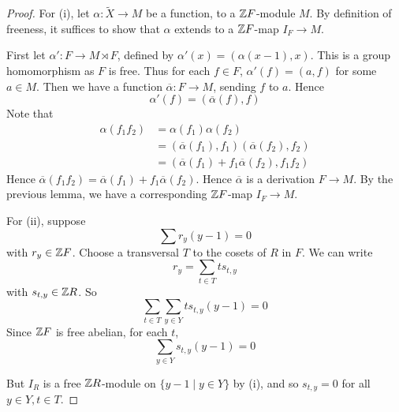 \documentclass{article}
\begin{document}
\begin{proof}
    For (i), let \(\alpha : \widetilde X \to M\) be a function, to a \(\mathbb{Z} F\)-module \(M\). By definition of freeness, it suffices to show that \(\alpha\) extends to a \(\mathbb{Z} F\)-map \(I_F \to M\).

    First let \(\alpha' : F \to M \rtimes F\), defined by \(\alpha'(x) = (\alpha(x - 1), x)\). This is a group homomorphism as \(F\) is free. Thus for each \(f \in F\), \(\alpha'(f) = (a, f)\) for some \(a \in M\). Then we have a function \(\overline{\alpha} : F \to M\), sending \(f\) to \(a\). Hence
    \[\alpha'(f) = (\overline{\alpha}(f), f)\]
    Note that 
    \begin{align*}
        \alpha(f_1f_2) &= \alpha(f_1)\alpha(f_2) \\
        &= (\overline{\alpha}(f_1), f_1)(\overline{\alpha}(f_2), f_2) \\
        &= (\overline{\alpha}(f_1) + f_1\overline{\alpha}(f_2), f_1f_2)
    \end{align*}
    Hence \(\overline{\alpha}(f_1f_2) = \overline{\alpha}(f_1) + f_1\overline{\alpha}(f_2)\). Hence \(\overline{\alpha}\) is a derivation \(F \to M\). By the previous lemma, we have a corresponding \(\mathbb{Z} F\)-map \(I_F \to M\).

    For (ii), suppose
    \[\sum r_y (y - 1) = 0\]
    with \(r_y \in \mathbb{Z} F\). Choose a transversal \(T\) to the cosets of \(R\) in \(F\). We can write
    \[r_y = \sum_{t \in T} ts_{t, y}\]
    with \(s_{t, y} \in \mathbb{Z} R\). So
    \[\sum_{t \in T}\sum_{y \in Y}t s_{t, y}(y - 1) = 0\]
    Since \(\mathbb{Z} F\) is free abelian, for each \(t\),
    \[\sum_{y \in Y} s_{t, y}(y - 1) = 0\]
    
    But \(I_R\) is a free \(\mathbb{Z} R\)-module on \(\{y - 1 \mid y \in Y\}\) by (i), and so \(s_{t, y} = 0\) for all \(y \in Y, t \in T\).
\end{proof}
\end{document}
